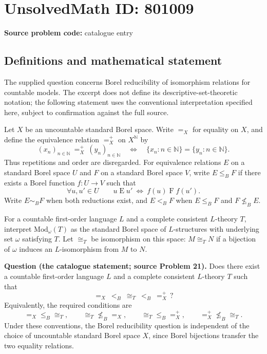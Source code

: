 \documentclass[11pt]{article}
\newcommand{\N}{\mathbb{N}}
\begin{document}
\section*{UnsolvedMath ID: 801009}
\textbf{Source problem code:} catalogue entry
\subsection{Definitions and mathematical statement}
The supplied question concerns Borel reducibility of isomorphism relations for countable models. The excerpt does not define its descriptive-set-theoretic notation; the following statement uses the conventional interpretation specified here, subject to confirmation against the full source.

Let \(X\) be an uncountable standard Borel space. Write \(=_X\) for equality on \(X\), and define the equivalence relation \(=_X^{+}\) on \(X^{\N}\) by
\[
(x_n)_{n\in\N}\ =_X^{+}\ (y_n)_{n\in\N}
\quad\Longleftrightarrow\quad
\{x_n:n\in\N\}=\{y_n:n\in\N\}.
\]
Thus repetitions and order are disregarded. For equivalence relations \(E\) on a standard Borel space \(U\) and \(F\) on a standard Borel space \(V\), write \(E\leq_B F\) if there exists a Borel function \(f:U\to V\) such that
\[
\forall u,u'\in U\qquad
u\mathrel{E}u'\ \Longleftrightarrow\ f(u)\mathrel{F}f(u').
\]
Write \(E\sim_B F\) when both reductions exist, and \(E<_B F\) when \(E\leq_B F\) and \(F\not\leq_B E\).

For a countable first-order language \(L\) and a complete consistent \(L\)-theory \(T\), interpret \(\mathrm{Mod}_{\omega}(T)\) as the standard Borel space of \(L\)-structures with underlying set \(\omega\) satisfying \(T\). Let \(\cong_T\) be isomorphism on this space: \(M\cong_T N\) if a bijection of \(\omega\) induces an \(L\)-isomorphism from \(M\) to \(N\).

\textbf{Question (the catalogue statement; source Problem 21).} Does there exist a countable first-order language \(L\) and a complete consistent \(L\)-theory \(T\) such that
\[
=_X\ <_B\ \cong_T\ <_B\ =_X^{+}\,?
\]
Equivalently, the required conditions are
\[
=_X\leq_B\cong_T,\qquad
\cong_T\not\leq_B=_X,\qquad
\cong_T\leq_B=_X^{+},\qquad
=_X^{+}\not\leq_B\cong_T.
\]
Under these conventions, the Borel reducibility question is independent of the choice of uncountable standard Borel space \(X\), since Borel bijections transfer the two equality relations.
\end{document}
